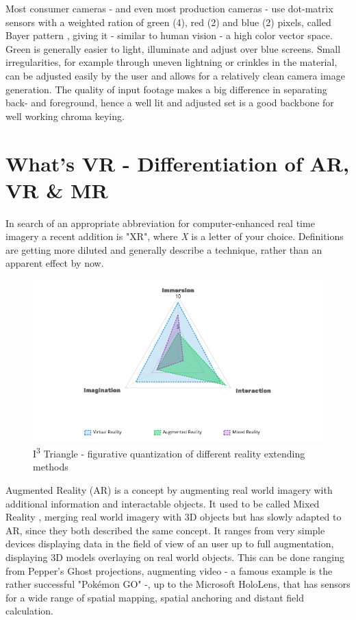 Most consumer cameras - and even most production cameras - use dot-matrix 
sensors with a weighted ration of green (4), red (2) and blue (2) pixels, 
called Bayer pattern \cite{kodak:bayer:1976}, giving it - similar to human 
vision - a high color vector space. Green is generally easier to light, 
illuminate and adjust over blue screens. Small irregularities, for example 
through uneven lightning or crinkles in the material, can be adjusted easily by 
the user and allows for a relatively clean camera image generation.
\newline
The quality of input footage makes a big difference in separating back- and 
foreground, hence a well lit and adjusted set is a good backbone for well 
working chroma keying.

\section{What's VR - Differentiation of AR, VR \& MR}

In search of an appropriate abbreviation for computer-enhanced real time 
imagery a recent addition is "XR", where \textit{X} is a letter of your choice. 
Definitions are getting more diluted and generally describe a technique, rather 
than an apparent effect by now.

\begin{figure}[htb]
	\includegraphics[width=\textwidth]{_raw_resources/i3-triangle.png}
	\caption{I\textsuperscript{3} Triangle - figurative quantization of 
		different reality extending methods}
	\label{fig:xr:i3-triangle}
\end{figure}
Augmented Reality (AR) is a concept by augmenting real world imagery with 
additional information and interactable objects. It used to be called Mixed 
Reality\cite{satoh:case:1998} \cite{tamura:mixed-reality:2001}, merging real 
world imagery with 3D objects but has slowly adapted to AR, since they both 
described the same concept. It ranges from very simple devices displaying data 
in the field of view of an user up to full augmentation, displaying 3D models 
overlaying on real world objects. This can be done ranging from Pepper's Ghost 
projections, augmenting video - a famous example is the rather successful 
"Pokémon GO" -, up to the Microsoft HoloLens, that has sensors for a wide range 
of spatial mapping, spatial anchoring and distant field calculation.

